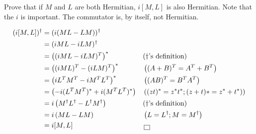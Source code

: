 \documentclass[solutions.tex]{subfiles}
\begin{document}
\maketitle
\begin{exercise} Prove that if $M$ and $L$ are both
Hermitian, $i[M,L]$ is also Hermitian. Note that the $i$
is important. The commutator is, by itself, not Hermitian.
\end{exercise}
\begin{align*}
	(i[M, L])^\dagger &= \left(i(ML - LM\right))^\dagger && ~\\
	~ &= (iML-iLM)^\dagger && ~\\
	~ &= \left((iML-iLM)^T\right)^* && \text{($\dagger$'s definition)}\\
	~ &= \left((iML)^T-(iLM)^T\right)^* && \left((A+B)^T = A^T + B^T\right)\\
	~ &= \left(iL^TM^T-iM^TL^T\right)^* && \left((AB)^T = B^TA^T\right)\\
	~ &= \left(-i(L^TM^T)^*+i(M^TL^T)^*\right) &&
		\left((zt)^* = z^*t^*; (z+t)* = z^*+t^*)\right)\\
	~ &= i\left(M^\dagger L^\dagger-L^\dagger M^\dagger\right) &&
		\text{($\dagger$'s definition)}\\
	~ &= i\left(ML-LM\right) &&
		\left(L=L^\dagger; M=M^\dagger\right) \\
	~ &= i[M, L] && \qed \\
\end{align*}
\end{document}

